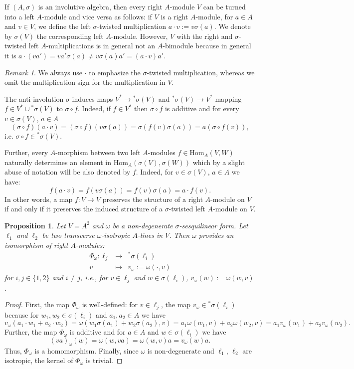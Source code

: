 \documentclass[oneside,11pt]{amsart}
\newtheorem{prop}[thm]{Proposition}
\theoremstyle{definition}
\theoremstyle{remark}
\newtheorem{rem}[thm]{Remark}
\numberwithin{thm}{section}
\numberwithin{equation}{section}
\begin{document}
If $(A,\sigma)$ is an involutive algebra, then every right $A$-module $V$ can be turned into a left $A$-module and vice versa as follows: if $V$ is a right $A$-module, for $a\in A$ and $v\in V$, we define the left $\sigma$-twisted multiplication $a\cdot v:=v\sigma(a)$. We denote by $\sigma(V)$ the corresponding left $A$-module. However, $V$ with the right and $\sigma$-twisted left $A$-multiplications is in general not an $A$-bimodule because in general it is $a\cdot(va')=va'\sigma(a)\neq v\sigma(a)a'=(a\cdot v)a'$. 

\begin{rem}
    We always use $\cdot$ to emphasize the $\sigma$-twisted multiplication, whereas we omit the multiplication sign for the multiplication in $V$.
\end{rem}

The anti-involution $\sigma$ induces maps $V^*\to {}^*\sigma(V)$ and ${}^*\sigma(V)\to V^*$ mapping $f\in V^*\cup {}^*\sigma(V)$ to $\sigma\circ f$. Indeed, if $f\in V^*$ then $\sigma\circ f$ is additive and for every $v\in\sigma(V)$, $a\in A$
$$(\sigma\circ f)(a\cdot v)=(\sigma\circ f)(v\sigma(a))=\sigma(f(v)\sigma(a))=a(\sigma\circ f(v)),$$
i.e. $\sigma\circ f\in {}^*\sigma(V)$.

Further, every $A$-morphism between two left $A$-modules $f\in\mathrm{Hom}_A(V,W)$ naturally determines an element in $\mathrm{Hom}_A(\sigma(V),\sigma(W))$ which by a slight abuse of notation will be also denoted by $f$. Indeed, for $v\in\sigma(V)$, $a\in A$ we have:
$$f(a\cdot v)=f(v\sigma(a))=f(v)\sigma(a)=a\cdot f(v).$$
In other words, a map $f\colon V\to V$ preserves the structure of a right $A$-module on $V$ if and only if it preserves the induced structure of a $\sigma$-twisted left $A$-module on $V$. 

\begin{prop}
    Let $V=A^2$ and $\omega$ be a non-degenerate $\sigma$-sesquilinear form. Let $\ell_1$ and $\ell_2$ be two transverse $\omega$-isotropic $A$-lines in $V$. Then $\omega$ provides an isomorphism of right $A$-modules:
    $$\begin{array}{rcl}
    \Phi_\omega\colon \ell_j & \to & {}^*\sigma(\ell_i)\\
    v & \mapsto & v_\omega:=\omega(\cdot,v)
    \end{array}$$
    for $i,j\in\{1,2\}$ and $i\neq j$, i.e., for $v\in\ell_j$ and $w\in\sigma(\ell_i)$, $v_\omega(w):=\omega(w,v)$. 
\end{prop}

\begin{proof}
    First, the map $\Phi_\omega$ is well-defined: for $v\in\ell_j$, the map $v_\omega\in {}^*\sigma(\ell_i)$ because for $w_1,w_2\in\sigma(\ell_i)$ and $a_1,a_2\in A$ we have
    $$v_\omega(a_1\cdot w_1+a_2\cdot w_2)=\omega(w_1\sigma(a_1)+w_2\sigma(a_2),v)=a_1\omega(w_1,v)+a_2\omega(w_2,v)=a_1v_\omega(w_1)+a_2v_\omega(w_2).$$
    Further, the map $\Phi_\omega$ is additive and for $a\in A$ and $w\in \sigma(\ell_i)$ we have $$(va)_\omega(w)=\omega(w,va)=\omega(w,v)a=v_\omega(w)a.$$
    Thus, $\Phi_\omega$ is a homomorphism. Finally, since $\omega$ is non-degenerate and $\ell_1$, $\ell_2$ are isotropic, the kernel of $\Phi_\omega$ is trivial.     
\end{proof}
 
\end{document}
